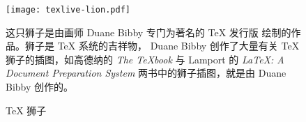 \begin{figure}
  \centering
  \texttt{[image: texlive-lion.pdf]}%
  \qquad
  \parbox[b]{0.4\textwidth}{这只狮子是由画师 Duane Bibby 专门为著名的
  \TeX{} 发行版 \TeXLive{} 绘制的作品。狮子是 \TeX{} 系统的吉祥物，
  Duane Bibby 创作了大量有关 \TeX{} 狮子的插图，如高德纳的 \textit{The
  \TeX{}book} 与 Lamport 的 \textit{\LaTeX: A Document Preparation
  System} 两书中的狮子插图，就是由 Duane Bibby 创作的。}
  \caption{\TeX{} 狮子}\label{fig:texlivelion}
\end{figure}
